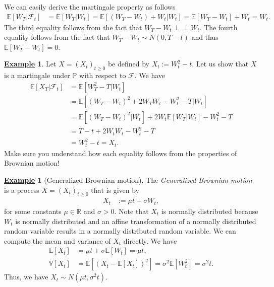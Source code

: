 \documentclass[12pt]{book}
\numberwithin{equation}{chapter}
\theoremstyle{plain}
\numberwithin{theorem}{section}
\theoremstyle{definition}
\newtheorem{example}[theorem]{\underline{Example}}
\numberwithin{exercise}{chapter}
\newcommand{\<}{\langle}
\renewcommand{\>}{\rangle}
\renewcommand{\(}{\left(}
\renewcommand{\)}{\right)}
\renewcommand{\[}{\left[}
\renewcommand{\]}{\right]}
\newcommand\Eb{\mathds{E}}
\newcommand\Pb{\mathds{P}}
\newcommand\Rb{\mathds{R}}
\newcommand\Vb{\mathds{V}}
\newcommand\Fc{\mathscr{F}}
\newcommand\sig{\sigma}
\newcommand{\ind}{\perp \! \! \! \perp}
\theoremstyle{definition}
\numberwithin{question}{section}
\begin{document}
\noindent
We can easily derive the martingale property as follows
\begin{align}
\Eb [W_T | \Fc_t ]
		&= \Eb[W_T | W_t] 
		 = \Eb[(W_T - W_t) + W_t | W_t] 
		 = \Eb[W_T - W_t] + W_t 
		 = W_t .
\end{align}
The third equality follows from the fact that $W_T - W_t \ind W_t$.  The fourth equality follows from the fact that $W_T - W_t \sim N(0,T-t)$ and thus $\Eb[W_T-W_t]=0$.

\begin{example}
Let $X = (X_t)_{t \geq 0}$ be defined by $X_t:= W_t^2 - t$.  Let us show that $X$ is a martingale under $\Pb$ with respect to $\Fc$.  We have
\begin{align}
\Eb [X_T | \Fc_t] 
		&= \Eb [W_T^2 - T | W_t] \\
		&= \Eb [ (W_T - W_t)^2 + 2 W_T W_t - W_t^2 - T | W_t] \\
		&= \Eb [ (W_T - W_t)^2 | W_t] + 2 W_t \Eb[W_T | W_t]  - W_t^2 - T \\
		&= T - t + 2 W_t W_t - W_t^2 - T \\
		&= W_t^2 - t = X_t .
\end{align}
Make sure you understand how each equality follows from the properties of Brownian motion!
\end{example}

\begin{example}[Generalized Brownian motion]
The \textit{Generalized Brownian motion} is a process $X = (X_t)_{t \geq 0}$ that is given by
\begin{align}
X_t 
	&:= \mu t + \sigma W_t,
\end{align}
for some constants $\mu \in \Rb$ and $\sig > 0$.  Note that $X_t$ is normally distributed because $W_t$ is normally distributed and an affine transformation of a normally distributed random variable results in a normally distributed random variable. 
We can compute the mean and variance of $X_t$ directly.  We have
\begin{align}
\Eb[X_t] 
	&= \mu t + \sigma \Eb[W_t] = \mu t  , \\
\Vb[X_t] 
	&= \Eb [(X_t - \Eb[X_t])^2]
	 = \sigma^2 \Eb [W_t^2] = \sigma^2 t  .	
\end{align}
Thus, we have $X_t \sim N(\mu t, \sig^2 t)$.
\end{example}
\end{document}

